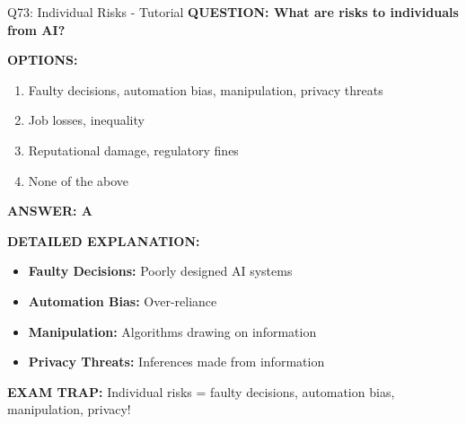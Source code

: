 \documentclass[8pt]{beamer}
\begin{document}
	\begin{frame}{Q73: Individual Risks - Tutorial}
		\fontsize{6.5}{7.5}\selectfont
		\textbf{QUESTION: What are risks to individuals from AI?}
		
		\vspace{0.1cm}
		\textbf{OPTIONS:}
		\begin{enumerate}
			\item Faulty decisions, automation bias, manipulation, privacy threats
			\item Job losses, inequality
			\item Reputational damage, regulatory fines
			\item None of the above
		\end{enumerate}
		
		\vspace{0.1cm}
		\textcolor{myblue}{\textbf{ANSWER: A}}
		
		\vspace{0.1cm}
		\textbf{DETAILED EXPLANATION:}
		\begin{itemize}
			\item \textbf{Faulty Decisions:} Poorly designed AI systems
			\item \textbf{Automation Bias:} Over-reliance
			\item \textbf{Manipulation:} Algorithms drawing on information
			\item \textbf{Privacy Threats:} Inferences made from information
		\end{itemize}
		
		\vspace{0.1cm}
		\textcolor{myred}{\textbf{EXAM TRAP:}} Individual risks = \textcolor{myblue}{faulty decisions, automation bias, manipulation, privacy}!
	\end{frame}
	
\end{document}
